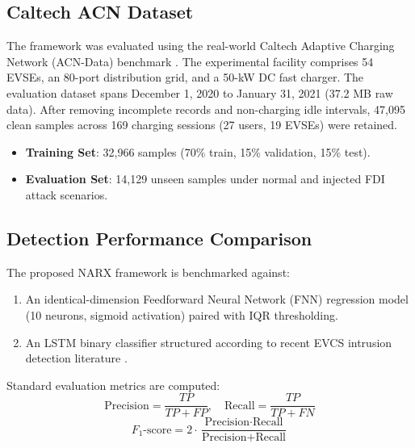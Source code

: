 \documentclass[conference]{IEEEtran}
\begin{document}
\subsection{Caltech ACN Dataset}
The framework was evaluated using the real-world Caltech Adaptive Charging Network (ACN-Data) benchmark \cite{Lee2019}. The experimental facility comprises 54 EVSEs, an 80-port distribution grid, and a 50-kW DC fast charger. The evaluation dataset spans December 1, 2020 to January 31, 2021 (37.2 MB raw data). After removing incomplete records and non-charging idle intervals, 47,095 clean samples across 169 charging sessions (27 users, 19 EVSEs) were retained. 
\begin{itemize}
    \item \textbf{Training Set}: 32,966 samples (70\% train, 15\% validation, 15\% test).
    \item \textbf{Evaluation Set}: 14,129 unseen samples under normal and injected FDI attack scenarios.
\end{itemize}

\subsection{Detection Performance Comparison}
The proposed NARX framework is benchmarked against:
\begin{enumerate}
    \item An identical-dimension Feedforward Neural Network (FNN) regression model (10 neurons, sigmoid activation) paired with IQR thresholding.
    \item An LSTM binary classifier structured according to recent EVCS intrusion detection literature \cite{Basnet2020}.
\end{enumerate}

Standard evaluation metrics are computed:
\begin{equation}
\text{Precision} = \frac{TP}{TP + FP}, \quad \text{Recall} = \frac{TP}{TP + FN}
\end{equation}
\begin{equation}
F_1\text{-score} = 2 \cdot \frac{\text{Precision} \cdot \text{Recall}}{\text{Precision} + \text{Recall}}
\end{equation}
\end{document}

